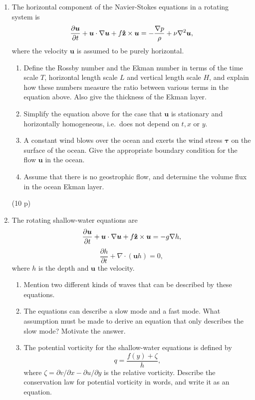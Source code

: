 \documentclass[12pt,a4paper]{article}
\newcommand{\bu}{\bm{u}}
\newcommand{\hz}{{\bf\hat{z}}}
\begin{document}
\begin{enumerate}
(10 p)
\item
The horizontal component of the Navier-Stokes equations in a rotating
system is
$$
\frac{\partial\bu}{\partial t}+\bu\cdot\nabla\bu+f\hz\times\bu =
-\frac{\nabla p}{\rho}+\nu\nabla^2 \bu,
$$
where the velocity $\bu$ is assumed to be purely horizontal.
\begin{enumerate}
  \item Define the Rossby number and the Ekman number in terms of the time
  scale $T$, horizontal length scale $L$ and vertical length scale $H$,
  and explain how these numbers measure the ratio between various
  terms in the equation above. Also give the thickness of the Ekman layer.
  \item Simplify the equation above for the case that $\bu$ is stationary
  and horizontally homogeneous, i.e.\ does not depend on $t, x$ or $y$.
  \item A constant wind blows over the ocean and exerts the wind stress
  $\bm{\tau}$ on the surface of the ocean. Give the appropriate
  boundary condition for the flow $\bu$ in the ocean.
  \item Assume that there is no geostrophic flow, and determine the volume
  flux in the ocean Ekman layer.
\end{enumerate}

(10 p)\\
\item
The rotating shallow-water equations are
$$
\frac{\partial \bu}{\partial t}+\bu\cdot\nabla\bu+f\hz\times\bu
= -g\nabla h,
$$
$$
\frac{\partial h}{\partial t}+\nabla\cdot(\bu h) = 0,
$$
where $h$ is the  depth and $\bu$ the velocity.
\begin{enumerate}
\item Mention two different kinds of waves that can be described by these equations. 
\item The equations can describe a slow mode and a fast mode. What assumption
must be made to derive an equation that only describes the slow mode? Motivate the answer.
\item The potential vorticity for the shallow-water equations is defined by
$$
q = \frac{f(y)+\zeta}{h},
$$
where $\zeta=\partial v/\partial x-\partial u/\partial y$ is the relative vorticity. Describe the
conservation law for potential vorticity in words, and write it as an equation.
\end{enumerate}


\end{enumerate}
\end{document}
